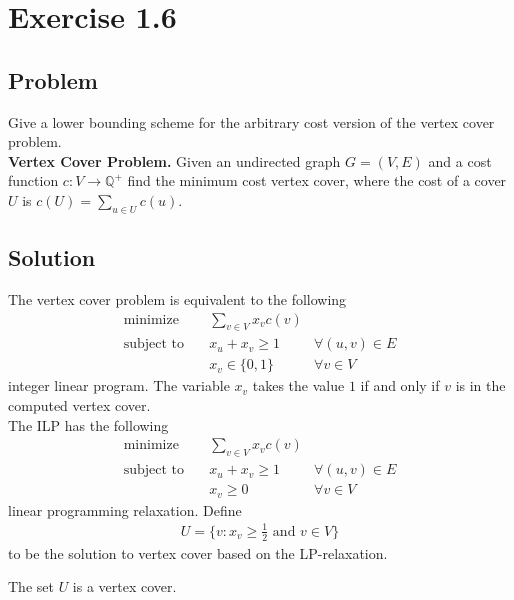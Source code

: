 \documentclass{article}
\begin{document}
\section*{Exercise 1.6}

\subsection*{Problem}

Give a lower bounding scheme for the arbitrary cost version of the vertex cover problem. 
\\

\textbf{Vertex Cover Problem.} Given an undirected graph $G = (V, E)$ and a cost 
function $c : V \rightarrow \mathbb{Q}^+$ find the minimum cost vertex cover, where the
cost of a cover $U$ is $c(U) = \sum\limits_{u \in U} c(u)$.

\subsection*{Solution}

The vertex cover problem is equivalent to the following 
\begin{align*}
    \text{minimize} \quad & \sum\limits_{v \in V} x_v c(v) \\
    \text{subject to} \quad
        & x_u + x_v \geq 1 \quad & \forall (u, v) \in E \\
        & x_v \in \{0, 1\} \quad & \forall v \in V
\end{align*}
integer linear program. The variable $x_v$ takes the value $1$ if and only if $v$ is in 
the computed vertex cover. \\

The ILP has the following
\begin{align*}
    \text{minimize} \quad & \sum\limits_{v \in V} x_v c(v) \\
    \text{subject to} \quad
        & x_u + x_v \geq 1 \quad & \forall (u, v) \in E \\
        & x_v \geq 0 \quad & \forall v \in V
\end{align*}
linear programming relaxation. Define
\begin{align*}
    U = \{v : x_v \geq \frac{1}{2} \text{ and } v \in V\}
\end{align*}
to be the solution to vertex cover based on the LP-relaxation.

\begin{theorem*}
    The set $U$ is a vertex cover.
\end{theorem*}
\end{document}
